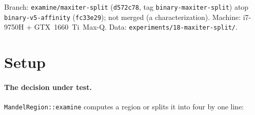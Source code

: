 \documentclass[
	english,
	letterpaper, oneside
]{article}
\begin{document}
\templatePagecfg
\templateFinalcfg

\inserttitle

\begin{center}\small\textsf{%
Branch: \texttt{examine/maxiter-split} (\texttt{d572c78}, tag
\texttt{binary-maxiter-split}) atop \texttt{binary-v5-affinity}
(\texttt{fc33e29}); not merged (a characterization). Machine: i7-9750H +
GTX~1660~Ti~Max-Q. Data: \texttt{experiments/18-maxiter-split/}.%
}\end{center}

\begin{abstract}
The subdivision heuristic computes a region (rather than splitting it) when its
nine stencil samples are ``uniform'': $\texttt{maxIter}-\texttt{minIter} <
\texttt{diffThresh}\cdot\texttt{maxIter}$. Inspecting the visualisations suggests
that at the tuned $\texttt{diffThresh}=0.1$ this is, in practice, just ``don't
split if the region is interior'' --- the cheapest way for nine samples to be
similar is for all of them to run to \texttt{MAXITER}. This report tests that by
replacing the relative-spread test with a parameter-free binary rule: compute iff
all nine samples reached \texttt{MAXITER} (\texttt{minIter}$=$frame
\texttt{MAXITER}), else split. The result is decisive: the two rules produce
byte-identical decompositions on the production zoom (5608
leaves both) and on three of the four report-13 regimes. They diverge only on
\texttt{outside} (uniform deep exterior): there \texttt{diffThreshold} keeps a
large uniform-exterior region as one leaf, while the binary rule splits it to the
floor ($+22\,\%$ leaves) --- at zero wall cost, since those leaves are
trivial iter-2 exterior. So $\texttt{diffThreshold}=0.1$ is a parameter-free
interior certificate on realistic content; the threshold's only distinctive job
is to avoid shattering large uniform-exterior regions, which is cost-free here.
This explains why $0.1$ is the sweet spot.
\end{abstract}

\section{Setup}

\paragraph{The decision under test.} \texttt{MandelRegion::examine} computes a
region or splits it into four by one line:
\end{document}
